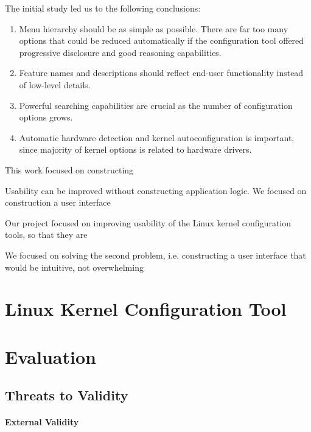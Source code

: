 \documentclass{chi2009}
\begin{document}

The initial study led us to the following conclusions:
\begin{enumerate}
\item Menu hierarchy should be as simple as possible. There are far too many options that could be reduced automatically if the configuration tool offered progressive disclosure and good reasoning capabilities.
\item Feature names and descriptions should reflect end-user functionality instead of low-level details.
\item Powerful searching capabilities are crucial as the number of configuration options grows.
\item Automatic hardware detection and kernel autoconfiguration is important, since majority of kernel options is related to hardware drivers.
\end{enumerate}

This work focused on constructing 

Usability can be improved without constructing application logic. We focused on construction a user interface

 Our project focused on improving usability of the Linux kernel configuration tools, so that they are 

We focused on solving the second problem, i.e. constructing a user interface that would be intuitive, not overwhelming 

\section{Linux Kernel Configuration Tool}\label{sec:lkc}





\section{Evaluation}\label{sec:evaluation}


\subsection{Threats to Validity}

\paragraph{External Validity}
\end{document}

